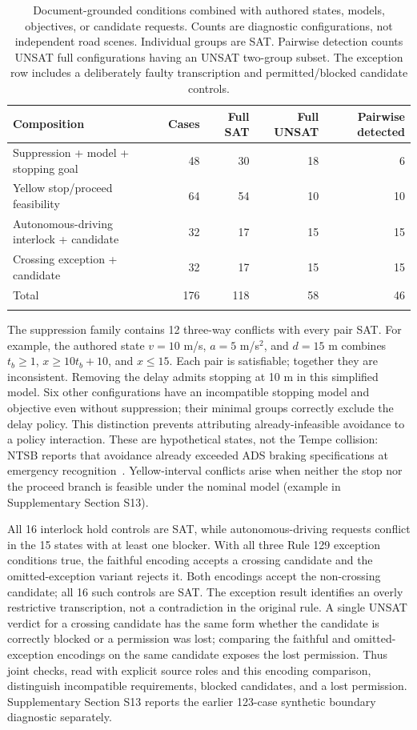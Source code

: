\begin{table}[tbp]
\caption{Document-grounded conditions combined with authored states, models,
objectives, or candidate requests. Counts are diagnostic configurations, not
independent road scenes. Individual groups are SAT. Pairwise detection counts
UNSAT full configurations having an UNSAT two-group subset. The exception
row includes a deliberately faulty transcription and permitted/blocked
candidate controls.}
\label{tab:results-composition}
\centering\footnotesize
\setlength{\tabcolsep}{3pt}
\begin{tabularx}{\linewidth}{@{}Xrrrr@{}}
\toprule
Composition & Cases & Full SAT & Full UNSAT & Pairwise detected\\
\midrule
Suppression + model + stopping goal & 48 & 30 & 18 & 6\\
Yellow stop/proceed feasibility & 64 & 54 & 10 & 10\\
Autonomous-driving interlock + candidate & 32 & 17 & 15 & 15\\
Crossing exception + candidate & 32 & 17 & 15 & 15\\
\midrule
Total & 176 & 118 & 58 & 46\\
\botrule
\end{tabularx}
\end{table}

The suppression family contains 12 three-way conflicts with every pair SAT.
For example, the authored state $v=10$ m/s, $a=5$ m/s$^2$, and $d=15$ m
combines $t_b\ge1$, $x\ge10t_b+10$, and $x\le15$. Each pair is satisfiable;
together they are inconsistent. Removing the delay admits stopping at 10 m
in this simplified model. Six other configurations have an incompatible
stopping model and objective even without suppression; their minimal groups
correctly exclude the delay policy. This distinction prevents attributing
already-infeasible avoidance to a policy interaction. These are hypothetical
states, not the Tempe collision: NTSB reports that avoidance already exceeded
ADS braking specifications at emergency recognition~\cite{NTSB2019Tempe}.
Yellow-interval conflicts arise when neither the stop nor the proceed branch
is feasible under the nominal model (example in Supplementary Section S13).

All 16 interlock hold controls are SAT, while autonomous-driving requests
conflict in the 15 states with at least one blocker. With all three Rule 129
exception conditions true, the faithful encoding accepts a crossing candidate
and the omitted-exception variant rejects it. Both encodings accept the
non-crossing candidate; all 16 such controls are SAT. The exception result
identifies an overly restrictive transcription, not a contradiction in the
original rule. A single UNSAT verdict for a crossing candidate has the same
form whether the candidate is correctly blocked or a permission was lost;
comparing the faithful and omitted-exception encodings on the same candidate
exposes the lost permission. Thus joint checks, read with explicit source
roles and this encoding comparison, distinguish incompatible requirements,
blocked candidates, and a lost permission.
Supplementary Section S13 reports the earlier 123-case synthetic boundary
diagnostic separately.

